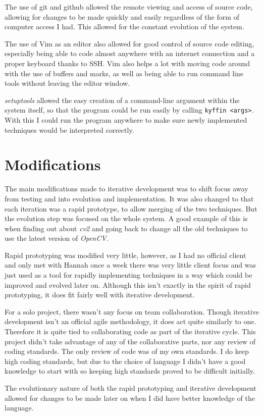 The use of git and github allowed the remote viewing and access of source code, allowing for
changes to be made quickly and easily regardless of the form of computer access I had. This 
allowed for the constant evolution of the system.

The use of Vim as an editor also allowed for good control of source code editing, especially being
able to code almost anywhere with an internet connection and a proper keyboard thanks to SSH. Vim
also helps a lot with moving code around with the use of buffers and marks, as well as being able
to run command line tools without leaving the editor window.

\emph{setuptools} allowed the easy creation of a command-line argument within the system itself,
so that the program could be run easily by calling \texttt{kyffin <args>}. With this I could run
the program anywhere to make sure newly implemented techniques would be interpreted correctly.


\section{Modifications}

The main modifications made to iterative development was to shift focus away from testing and into
evolution and implementation. It was also changed to that each iteration was a rapid prototype,
to allow merging of the two techniques. But the evolution step was focused on the whole system.
A good example of this is when finding out about \emph{cv2} and going back to change all the old
techniques to use the latest version of \emph{OpenCV}.

Rapid prototyping was modified very little, however, as I had no official client and only met with
Hannah once a week there was very little client focus and was just used as a tool for rapidly
implementing techniques in a way which could be improved and evolved later on. Although this isn't
exactly in the spirit of rapid prototyping, it does fit fairly well with iterative development.

For a solo project, there wasn't any focus on team collaboration. Though iterative development 
isn't an official agile methodology, it does act quite similarly to one. Therefore it is quite 
tied to collaborating code as part of the iterative cycle. This project didn't take advantage of
any of the collaborative parts, nor any review of coding standards. The only review of code was
of my own standards. I do keep high coding standards, but due to the choice of language I didn't
have a good knowledge to start with so keeping high standards proved to be difficult initially.

The evolutionary nature of both the rapid prototyping and iterative development allowed for 
changes to be made later on when I did have better knowledge of the language. 

